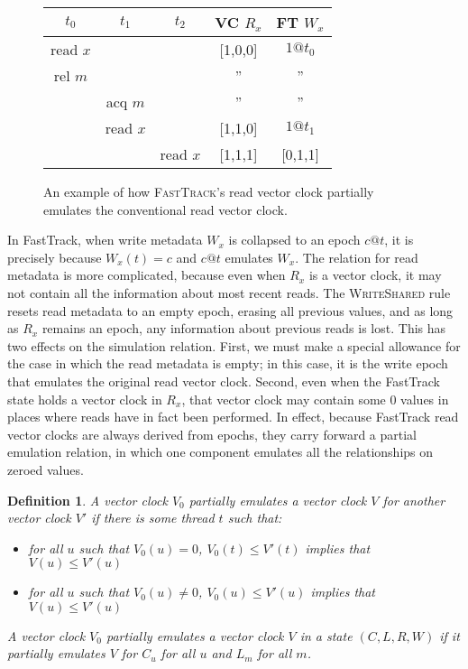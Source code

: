 \documentclass[preprint, 10pt]{sigplanconf}
\newcommand{\Tid}{t}
\newcommand{\Address}{x}
\newcommand{\Lock}{m}
\newcommand{\VCFont}{}
\newcommand{\ReadVC}[1]{\VCFont{R}_{#1}}
\newcommand{\WriteVC}[1]{\VCFont{W}_{#1}}
\newcommand{\FT}{\textsc{FastTrack}\xspace}
\newcommand{\Rule}[1]{\textsc{#1}}
\newtheorem{definition}{Definition}
\begin{document}
\begin{figure}[htb]
\centering
\begin{tabular}{ccc|c|c|}
$\Tid_0$ & $\Tid_1$ & $\Tid_2$ & VC $\ReadVC{\Address}$ & FT $\WriteVC{\Address}$ \\
\hline
read $\Address$ & &      & [1,0,0] & $1@t_0$\\
rel $\Lock$ & &      &''&''\\
& acq $\Lock$ &      &''&''\\
& read $\Address$ &      &[1,1,0]&$1@t_1$\\
& & read $\Address$      &[1,1,1]&[0,1,1]\\
\end{tabular}
\caption{An example of how \FT's read vector clock partially emulates the conventional read vector clock.}
\label{f:encap-readvc}
\end{figure}

In FastTrack, when write metadata $W_x$ is collapsed to an epoch $c@t$, it is precisely because $W_x(t) = c$ and $c@t$ emulates $W_x$. The relation for read metadata is more complicated, because even when $R_x$ is a vector clock, it may not contain all the information about most recent reads. The \Rule{WriteShared} rule resets read metadata to an empty epoch, erasing all previous values, and as long as $R_x$ remains an epoch, any information about previous reads is lost. This has two effects on the simulation relation. First, we must make a special allowance for the case in which the read metadata is empty; in this case, it is the write epoch that emulates the original read vector clock. Second, even when the FastTrack state holds a vector clock in $R_x$, that vector clock may contain some 0 values in places where reads have in fact been performed. In effect, because FastTrack read vector clocks are always derived from epochs, they carry forward a partial emulation relation, in which one component emulates all the relationships on zeroed values.
\begin{definition}A vector clock $V_0$ \emph{partially emulates} a vector clock $V$ for another vector clock $V'$ if there is some thread $t$ such that:

\begin{itemize}
\item for all $u$ such that $V_0(u) = 0$, $V_0(t) \le V'(t)$ implies that $V(u) \le V'(u)$
\item for all $u$ such that $V_0(u) \neq 0$, $V_0(u) \le V'(u)$ implies that $V(u) \le V'(u)$
\end{itemize}
A vector clock $V_0$ partially emulates a vector clock $V$ in a state $(C, L, R, W)$ if it partially emulates $V$ for $C_u$ for all $u$ and $L_m$ for all $m$.\end{definition}
\end{document}
